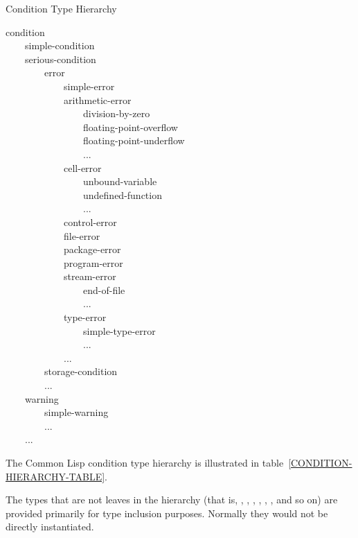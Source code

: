 \begin{table}[t]
\caption{Condition Type Hierarchy}
\label{CONDITION-HIERARCHY-TABLE}
\begin{lisp}
condition \\
~~~~simple-condition \\
~~~~serious-condition \\
~~~~~~~~error \\
~~~~~~~~~~~~simple-error \\
~~~~~~~~~~~~arithmetic-error \\
~~~~~~~~~~~~~~~~division-by-zero \\
~~~~~~~~~~~~~~~~floating-point-overflow \\
~~~~~~~~~~~~~~~~floating-point-underflow \\
~~~~~~~~~~~~~~~~... \\
~~~~~~~~~~~~cell-error \\
~~~~~~~~~~~~~~~~unbound-variable \\
~~~~~~~~~~~~~~~~undefined-function \\
~~~~~~~~~~~~~~~~... \\
~~~~~~~~~~~~control-error \\
~~~~~~~~~~~~file-error \\
~~~~~~~~~~~~package-error \\
~~~~~~~~~~~~program-error \\
~~~~~~~~~~~~stream-error \\
~~~~~~~~~~~~~~~~end-of-file \\
~~~~~~~~~~~~~~~~... \\
~~~~~~~~~~~~type-error \\
~~~~~~~~~~~~~~~~simple-type-error \\
~~~~~~~~~~~~~~~~... \\
~~~~~~~~~~~~... \\
~~~~~~~~storage-condition \\
~~~~~~~~... \\
~~~~warning \\
~~~~~~~~simple-warning \\
~~~~~~~~... \\
~~~~...
\end{lisp}
\vfill
\end{table}

The Common Lisp condition type hierarchy is illustrated in table~\ref{CONDITION-HIERARCHY-TABLE}.

The types that are not leaves in the hierarchy (that is, , ,
, , , ,
and so on) are provided
primarily for type inclusion purposes. Normally they would not be directly
instantiated. 

